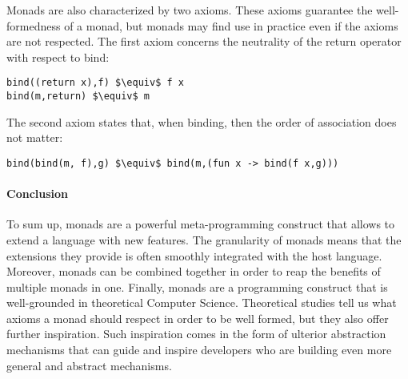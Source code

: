 Monads are also characterized by two axioms. These axioms guarantee the well-formedness of a monad, but monads may find use in practice even if the axioms are not respected. The first axiom concerns the neutrality of the return operator with respect to bind:

\begin{lstlisting}
bind((return x),f) $\equiv$ f x
bind(m,return) $\equiv$ m
\end{lstlisting}

The second axiom states that, when binding, then the order of association does not matter:

\begin{lstlisting}
bind(bind(m, f),g) $\equiv$ bind(m,(fun x -> bind(f x,g)))
\end{lstlisting}

\paragraph{Conclusion}
To sum up, monads are a powerful meta-programming construct that allows to extend a language with new features. The granularity of monads means that the extensions they provide is often smoothly integrated with the host language. Moreover, monads can be combined together in order to reap the benefits of multiple monads in one. Finally, monads are a programming construct that is well-grounded in theoretical Computer Science. Theoretical studies tell us what axioms a monad should respect in order to be well formed, but they also offer further inspiration. Such inspiration comes in the form of ulterior abstraction mechanisms that can guide and inspire developers who are building even more general and abstract mechanisms.
